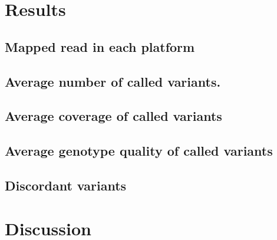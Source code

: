 \documentclass[11pt]{article} %
\begin{document}
\section{Results}

\subsection{Mapped read in each platform }

\subsection{Average number of called variants.}

\subsection{Average coverage of called variants}

\subsection{Average genotype quality of called variants}

\subsection{Discordant variants}


\section{Discussion}
\newpage


\end{document}
